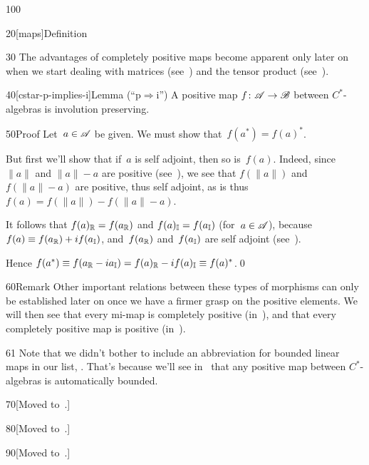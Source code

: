 \begin{parsec}{100}
\begin{point}{20}[maps]{Definition}
\begin{point}{30}
The advantages of completely positive maps
become apparent
only later on 
when we start dealing with matrices (see~)
and the tensor product (see~).
\end{point}
\end{point}
\begin{point}{40}[cstar-p-implies-i]{Lemma (``p$\Rightarrow$i'')}
A positive map $f\colon \mathscr{A}\to\mathscr{B}$ between
$C^*$-algebras is involution preserving.
\begin{point}{50}{Proof}%
Let~$a\in \mathscr{A}$ be given. We must show that~$f(a^*)=f(a)^*$.

But first we'll show that if~$a$ is self adjoint,
then so is~$f(a)$.
Indeed, since $\|a\|$ and $\|a\|-a$ are positive (see~),
we see that $f(\|a\|)$ and $f(\|a\|-a)$ are positive,
thus self adjoint,
as is thus~$f(a)=f(\|a\|)-f(\|a\|-a)$.

It follows that $f(a)_{\mathbb{R}}=f(a_{\mathbb{R}})$
and $f(a)_{\mathbb{I}}=f(a_{\mathbb{I}})$ (for~$a\in\mathscr{A}$),
because $f(a)\equiv f(a_{\mathbb{R}})+if(a_{\mathbb{I}})$,
and~$f(a_{\mathbb{R}})$ and~$f(a_{\mathbb{I}})$
are self adjoint
(see~).

Hence $f(a^*)\equiv f(a_{\mathbb{R}}-ia_{\mathbb{I}})
=f(a)_{\mathbb{R}}-if(a)_{\mathbb{I}}\equiv f(a)^*$.\qed
\end{point}
\end{point}
\begin{point}{60}{Remark}%
Other important relations between these types of morphisms
can only be established later on
once we have a firmer grasp on the positive elements.
We will then see  
that every mi-map 
is completely positive (in~),
and that every completely positive map is positive 
(in~).
\begin{point}{61}%
Note that we didn't bother to include
an abbreviation for bounded linear maps in our list, .
That's because we'll see in~ that any positive
map between $C^*$-algebras is automatically bounded.
\end{point}
\end{point}
\begin{point}{70}{[Moved to~.]}%
\end{point}
\begin{point}{80}{[Moved to~.]}%
\begin{point}{90}{[Moved to~.]}%
\end{point}%
\end{point}%
\end{parsec}%
